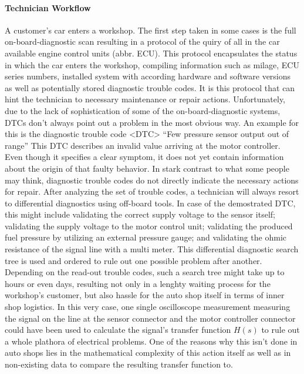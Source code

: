 \paragraph{Technician Workflow}
A customer's car enters a workshop. 
The first step taken in some cases is the full on-board-diagnostic scan resulting in a protocol of the quiry of all in the car available engine control units (abbr. ECU). 
This protocol encapsulates the status in which the car enters the workshop, compiling information such as milage, ECU series numbers, installed system with according hardware and software versions as well as potentially stored diagnostic trouble codes.
It is this protocol that can hint the technician to necessary maintenance or repair actions.
Unfortunately, due to the lack of sophistication of some of the on-board-diagnostic systems, DTCs don't always point out a problem in the most obvious way. 
An example for this is the diagnostic trouble code <DTC>
``Few pressure sensor output out of range'' This DTC describes an invalid value arriving at the motor controller.
Even though it specifies a clear symptom, it does not yet contain information about the origin of that faulty behavior.
In stark contrast to what some people may think, diagnostic trouble codes do not directly indicate the necessary actions for repair.
After analyzing the set of trouble codes, a technician will always resort to differential diagnostics using off-board tools.
In case of the demostrated DTC, this might include validating the correct supply voltage to the sensor itself; 
validating the supply voltage to the motor control unit; validating the produced fuel pressure by utilizing an external pressure gauge; and validating the ohmic resistance of the signal line with a multi meter.
This differential diagnostic search tree is used and ordered to rule out one possible problem after another.
Depending on the read-out trouble codes, such a search tree might take up to hours or even days, resulting not only in a lenghty waiting process for the workshop's customer, but also hassle for the auto shop itself in terms of inner shop logistics.
In this very case, one single oscilloscope measurement measuring the signal on the line at the sensor connector and the motor controller connector could have been used to calculate the signal's transfer function $H(s)$ to rule out a whole plathora of electrical problems.
One of the reasons why this isn't done in auto shops lies in the mathematical complexity of this action itself as well as in non-existing data to compare the resulting transfer function to.
